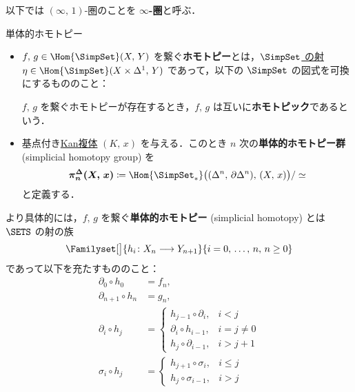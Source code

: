 \documentclass[TQFT_main]{subfiles}
\begin{document}
\begin{marker}
    以下では $(\infty,\, 1)$-圏のことを $\bm{\infty}$\textbf{-圏}と呼ぶ．
\end{marker}

\begin{mydef}[label=def:SimpSet-homotopic]{単体的ホモトピー}
    \begin{itemize}
        \item $f,\, g \in \Hom{\SimpSet} (X,\, Y)$ を繋ぐ\textbf{ホモトピー}とは，\hyperref[def:simplicial-sets]{$\SimpSet$ の射} $\eta \in \Hom{\SimpSet}(X \times \Delta^1,\, Y)$ であって，以下の $\SimpSet$ の図式を可換にするもののこと：
        \begin{center}
        \end{center}
        $f,\, g$ を繋ぐホモトピーが存在するとき，$f,\, g$ は互いに\textbf{ホモトピック}であるという．
        \item 基点付き\hyperref[def:KanCplx]{Kan複体} $(K,\, x)$ を与える．このとき $n$ 次の\textbf{単体的ホモトピー群} (simplicial homotopy group) を
        \begin{align}
            \bm{\pi^\Delta_n (X,\, x)} \coloneqq \Hom{\SimpSet_*} \bigl( (\Delta^n,\, \partial\Delta^n),\, (X,\, x) \bigr) / \simeq
        \end{align}
        と定義する．
    \end{itemize}
    

    \tcblower

    より具体的には，$f,\, g$ を繋ぐ\textbf{単体的ホモトピー} (simplicial homotopy) とは $\SETS$ の射の族
    \begin{align}
        \Familyset[\big]{h_i \colon X_n \lto Y_{n+1}}{i = 0,\, \dots,\, n,\, n \ge 0}
    \end{align}
    であって以下を充たすもののこと：
    \begin{align}
        \partial_0 \circ h_0 &= f_n, \\
        \partial_{n+1} \circ h_n &= g_n, \\
        \partial_i \circ h_j &=
        \begin{cases}
            h_{j-1} \circ \partial_{i}, &i < j \\
            \partial_i \circ h_{i-1}, &i=j \neq 0 \\
            h_j \circ \partial_{i-1}, &i > j+1
        \end{cases} \\
        \sigma_i \circ h_j &=
        \begin{cases}
            h_{j+1} \circ \sigma_i, &i \le j \\
            h_j \circ \sigma_{i-1}, &i > j
        \end{cases}
    \end{align}
    

\end{mydef}
\end{document}

